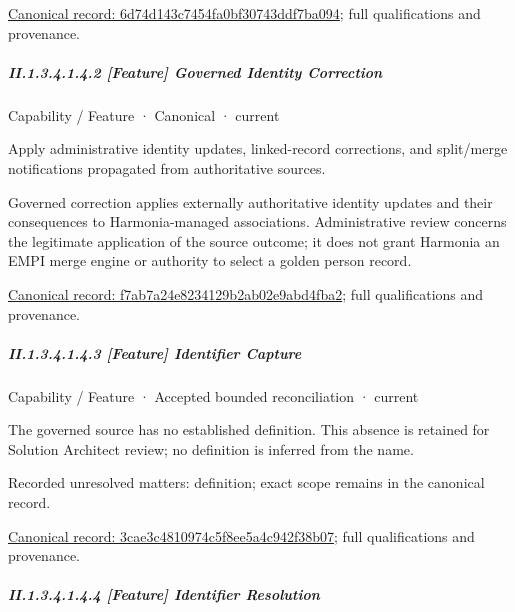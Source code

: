 {\footnotesize \href{../../../../../../../continuum/strategy/capability/feature/6d74d143c7454fa0bf30743ddf7ba094.md}{Canonical record: 6d74d143c7454fa0bf30743ddf7ba094}; full qualifications and provenance.}\par
\subparagraph*{II.1.3.4.1.4.2 [Feature] Governed Identity Correction}
\label{navigation:II.1.3.4.1.4.2}

\label{element:f7ab7a24e8234129b2ab02e9abd4fba2}
{\small Capability / Feature · Canonical · current}\par

Apply administrative identity updates, linked-record corrections, and split/merge notifications propagated from authoritative sources.



Governed correction applies externally authoritative identity updates and their consequences to Harmonia-managed associations. Administrative review concerns the legitimate application of the source outcome; it does not grant Harmonia an EMPI merge engine or authority to select a golden person record.


{\footnotesize \href{../../../../../../../continuum/strategy/capability/feature/f7ab7a24e8234129b2ab02e9abd4fba2.md}{Canonical record: f7ab7a24e8234129b2ab02e9abd4fba2}; full qualifications and provenance.}\par
\subparagraph*{II.1.3.4.1.4.3 [Feature] Identifier Capture}
\label{navigation:II.1.3.4.1.4.3}

\label{element:3cae3c4810974c5f8ee5a4c942f38b07}
{\small Capability / Feature · Accepted bounded reconciliation · current}\par

The governed source has no established definition. This absence is retained for Solution Architect review; no definition is inferred from the name.


{\small Recorded unresolved matters: definition; exact scope remains in the canonical record.}\par
{\footnotesize \href{../../../../../../../continuum/strategy/capability/feature/3cae3c4810974c5f8ee5a4c942f38b07.md}{Canonical record: 3cae3c4810974c5f8ee5a4c942f38b07}; full qualifications and provenance.}\par
\subparagraph*{II.1.3.4.1.4.4 [Feature] Identifier Resolution}
\label{navigation:II.1.3.4.1.4.4}


